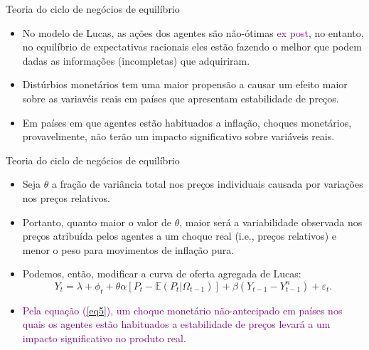 \documentclass[10pt]{beamer}
\begin{document}
\begin{frame}{Teoria do ciclo de negócios de equilíbrio}
    \begin{itemize}
        \item No modelo de Lucas, as ações dos agentes são não-ótimas \textcolor{purple}{ex post}, no entanto, no equilíbrio de expectativas racionais eles estão fazendo o melhor que podem dadas as informações (incompletas) que adquiriram.
        \bigskip
        \item Distúrbios monetários tem uma maior propensão a causar um efeito maior sobre as variavéis reais em países que apresentam estabilidade de preços.
        \bigskip
        \item Em países em que agentes estão habituados a inflação, choques monetários, provavelmente, não terão um impacto significativo sobre variáveis reais.
    \end{itemize}
\end{frame}

\begin{frame}{Teoria do ciclo de negócios de equilíbrio}
    \begin{itemize}
        \item Seja $\theta$ a fração de variância total nos preços individuais causada por variações nos preços relativos.
        \bigskip
        \item Portanto, quanto maior o valor de $\theta$, maior será a variabilidade observada nos preços atribuída pelos agentes a um choque real (i.e., preços relativos) e menor o peso para movimentos de inflação pura.
        \bigskip
        \item Podemos, então, modificar a curva de oferta agregada de Lucas:
        \begin{equation}
            Y_t = \lambda + \phi_t + \theta\alpha[P_t - \mathbb{E}(P_t|\Omega_{t-1})] + \beta(Y_{t-1} - Y_{t-1}^n) + \varepsilon_t.
            \label{eq5}
        \end{equation}
        \bigskip
        \item \textcolor{purple}{Pela equação (\ref{eq5}), um choque monetário não-antecipado em países nos quais os agentes estão habituados a estabilidade de preços levará a um impacto significativo no produto real}.
    \end{itemize}
\end{frame}
\end{document}
